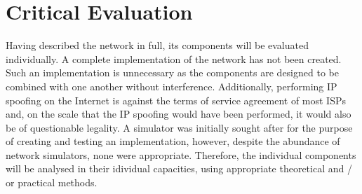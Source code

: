 \documentclass[ %
                    author={Luke Murray},
                supervisor={Dr. Simon Hollis},
                     title={Shadow Peer-to-Peer Networks},
                  subtitle={},
                    degree={MEng},
                      year={2013} ]{thesis}
\begin{document}

\chapter{Critical Evaluation}
\label{chap:evaluation}

Having described the network in full, its components will be evaluated individually. A complete implementation of the network has not been created. Such an implementation is unnecessary as the components are designed to be combined with one another without interference. Additionally, performing IP spoofing on the Internet is against the terms of service agreement of most ISPs and, on the scale that the IP spoofing would have been performed, it would also be of questionable legality. A simulator was initially sought after for the purpose of creating and testing an implementation, however, despite the abundance of network simulators, none were appropriate. Therefore, the individual components will be analysed in their idividual capacities, using appropriate theoretical and / or practical methods.
\end{document}
